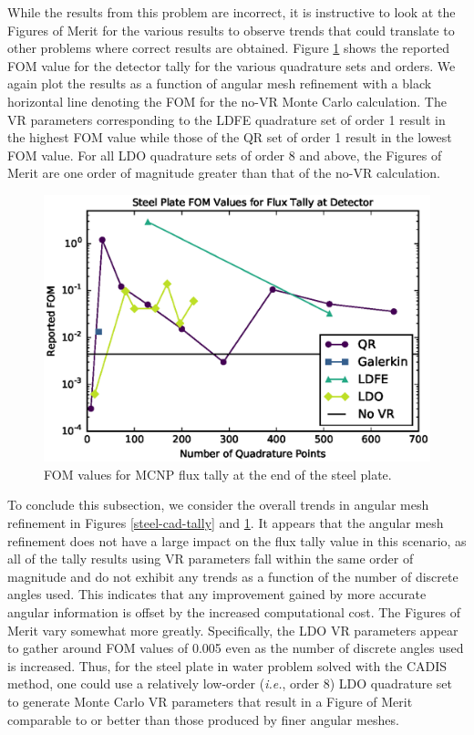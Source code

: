 \documentclass{article} %
\begin{document}
While the results from this problem are incorrect, it is instructive to look
at the Figures of Merit for the various results to observe trends that could
translate to other problems where correct results are obtained. Figure 
\ref{steel-cad-fom} shows the reported FOM value for the detector tally for the
various quadrature sets and orders. We again plot the results as a function of
angular mesh refinement with a black horizontal line denoting the FOM for the
no-VR Monte Carlo calculation. The VR parameters corresponding to the
LDFE quadrature set of order 1 result in the highest FOM value while those of
the QR set of order 1 result in the lowest FOM value. For all LDO quadrature
sets of order 8 and above, the Figures of Merit are one order of magnitude
greater than that of the no-VR calculation.

\begin{figure}[!htb]
\centering
\includegraphics[max height=0.445\textheight]{steel-cadis-fom.eps}
\caption{FOM values for MCNP flux tally at the end of the steel plate.}
\label{steel-cad-fom}
\end{figure}

To conclude this subsection, we consider the overall trends in angular mesh
refinement in Figures \ref{steel-cad-tally} and \ref{steel-cad-fom}. It
appears that the angular mesh refinement does not have a large impact on the
flux tally value in this scenario, as all of the tally results using VR
parameters fall within the same order of magnitude and do not exhibit any
trends as a function of the number of discrete angles used. This indicates
that any improvement gained by more accurate angular information is offset by
the increased computational cost. The Figures of Merit vary somewhat more
greatly. Specifically, the LDO VR parameters appear to gather around FOM
values of 0.005 even as the number of discrete angles used is increased. Thus,
for the steel plate in water problem solved with the CADIS method, one could
use a relatively low-order (\textit{i.e.}, order 8) LDO quadrature set to
generate Monte Carlo VR parameters that result in a Figure of Merit comparable
to or better than those produced by finer angular meshes.
\end{document}
